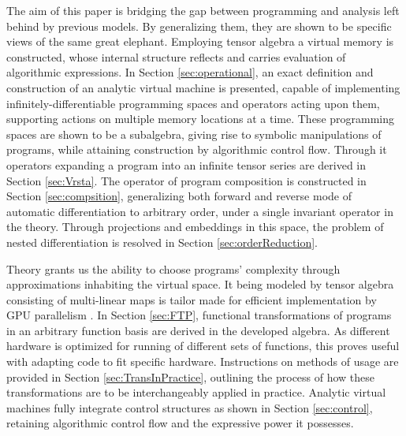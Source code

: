 \documentclass[smallcondensed]{svjour3}
\begin{document}
The aim of this paper is bridging the gap between programming and analysis left behind by previous models. By generalizing them, they are shown to be specific views of the same great elephant. Employing tensor algebra a virtual memory is constructed, whose internal structure reflects and carries evaluation of algorithmic expressions. In Section \ref{sec:operational}, an exact definition and construction of an analytic virtual machine is presented, capable of implementing infinitely-differentiable programming spaces and operators acting upon them, supporting actions on multiple memory locations at a time. These programming spaces are shown to be a subalgebra, giving rise to symbolic manipulations of programs, while attaining construction by algorithmic control flow. Through it operators expanding a program into an infinite tensor series are derived in Section \ref{sec:Vrsta}. The operator of program composition is constructed in Section \ref{sec:compsition}, generalizing both forward \cite{PcAD} and reverse \cite{ReverseAD} mode of automatic differentiation to arbitrary order, under a single invariant operator in the theory. Through projections and embeddings in this space, the problem of nested differentiation is resolved in Section \ref{sec:orderReduction}.

Theory grants us the ability to choose programs' complexity through approximations inhabiting the virtual space. It being modeled by tensor algebra consisting of multi-linear maps is tailor made for efficient implementation by GPU parallelism \cite{TensorGPU}. In Section \ref{sec:FTP}, functional transformations of programs in an arbitrary function basis are derived in the developed algebra. 
As different hardware is optimized for running of different sets of functions, this proves useful with adapting code to fit specific hardware.
Instructions on methods of usage are provided in Section \ref{sec:TransInPractice}, outlining the process of how these transformations are to be interchangeably applied in practice. 
Analytic virtual machines fully integrate control structures as shown in Section \ref{sec:control}, retaining algorithmic control flow and the expressive power it possesses.
 
\end{document}

